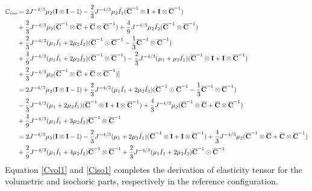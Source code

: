\begin{equation} \label{Ciso1}
\begin{split}
\mathbb{C}_{iso} 
&= 
2{J}^{-4/3}\mu_2(\bold{I} \otimes \bold{I} - \mathbb{I}) - \frac{2}{3}J^{-4/3}\mu_2\bar{I_1}({\overline{\bold{C}}}^{-1} \otimes \bold{I} + \bold{I} \otimes {\overline{\bold{C}}}^{-1}) \\
&+
\frac{2}{3}J^{-4/3}\mu_2({\overline{\bold{C}}}^{-1} \otimes {\overline{\bold{C}}} + {\overline{\bold{C}}} \otimes {\overline{\bold{C}}}^{-1}) + \frac{4}{9}J^{-4/3}\mu_2\bar{I_2}({\overline{\bold{C}}}^{-1} \otimes {\overline{\bold{C}}}^{-1}) \\
&+
\frac{2}{3}J^{-4/3}(\mu_1\bar{I_1} + 2\mu_2\bar{I_2})({\overline{\bold{C}}}^{-1} \odot {{\overline{\bold{C}}}}^{-1} - \frac{1}{3}{{\overline{\bold{C}}}}^{-1} \otimes {\overline{{\bold{C}}}}^{-1}) \\
&+
\frac{4}{9}J^{-4/3} (\mu_1\bar{I_1} + 2\mu_2\bar{I_2})({\overline{\bold{C}}}^{-1} \otimes {\overline{\bold{C}}}^{-1}) - \frac{2}{3}J^{-4/3}(\mu_1+\mu_2\bar{I_1})({\overline{\bold{C}}}^{-1} \otimes \bold{I} + \bold{I} \otimes {\overline{\bold{C}}}^{-1})\\
&+ \frac{2}{3}J^{-4/3}\mu_2({\overline{\bold{C}}}^{-1} \otimes {\overline{\bold{C}}}+{\overline{\bold{C}}} \otimes {\overline{\bold{C}}}^{-1}) ] \\
&=
2{J}^{-4/3}\mu_2(\bold{I} \otimes \bold{I} - \mathbb{I}) + \frac{2}{3}J^{-4/3}(\mu_1\bar{I_1} + 2\mu_2\bar{I_2})({\overline{\bold{C}}}^{-1} \odot {\overline{\bold{C}}}^{-1} - \frac{1}{3}{\overline{\bold{C}}}^{-1} \otimes {\overline{\bold{C}}}^{-1}) \\
&-
\frac{2}{3}J^{-4/3}(\mu_1 + 2\mu_2\bar{I_1})({\overline{\bold{C}}}^{-1} \otimes \bold{I} + \bold{I} \otimes {\overline{\bold{C}}}^{-1}) + \frac{4}{3}J^{-4/3}\mu_2({\overline{\bold{C}}}^{-1} \otimes {\overline{\bold{C}}} + {\overline{\bold{C}}} \otimes {\overline{\bold{C}}}^{-1}) \\
&+
\frac{4}{9}J^{-4/3}(\mu_1\bar{I_1} + 3\mu_2\bar{I_2}){\overline{\bold{C}}}^{-1} \otimes {\overline{\bold{C}}}^{-1} \\
&=
2{J}^{-4/3}\mu_2(\bold{I} \otimes \bold{I} - \mathbb{I}) - \frac{2}{3}J^{-4/3}(\mu_1 + 2\mu_2\bar{I_1})({\overline{\bold{C}}}^{-1} \otimes \bold{I} + \bold{I} \otimes {\overline{\bold{C}}}^{-1}) + \frac{4}{3}J^{-4/3}\mu_2({\overline{\bold{C}}}^{-1} \otimes {\overline{\bold{C}}} + {\overline{\bold{C}}} \otimes {\overline{\bold{C}}}^{-1}) \\
&+
\frac{2}{9}J^{-4/3}(\mu_1\bar{I_1} + 4\mu_2\bar{I_2}) {\overline{\bold{C}}}^{-1} \otimes {\overline{\bold{C}}}^{-1} + \frac{2}{3}J^{-4/3}(\mu_1\bar{I_1} + 2\mu_2\bar{I_2}){\overline{\bold{C}}}^{-1} \odot {\overline{\bold{C}}}^{-1} 
\end{split}
\end{equation} 
Equation \ref{Cvol1} and \ref{Ciso1} completes the derivation of elasticity tensor for the volumetric and isochoric parts, respectively in the reference configuration.



